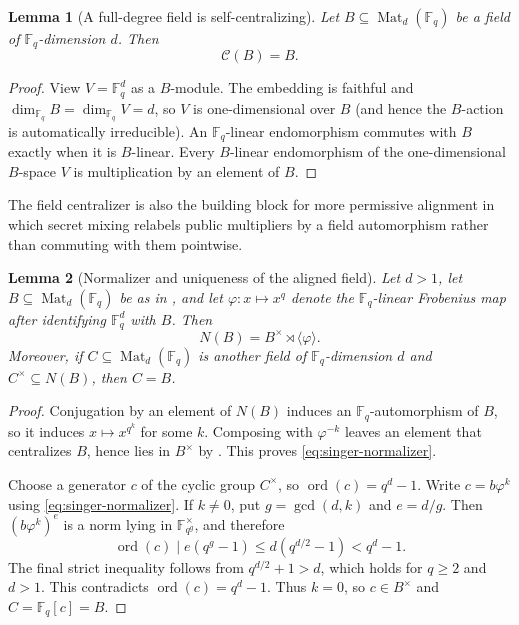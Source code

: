 \documentclass[11pt]{article}
\newtheorem{lemma}[lemma]{Lemma}
\newcommand{\F}{\mathbb F}
\newcommand{\Mat}{\operatorname{Mat}}
\begin{document}
\begin{lemma}[A full-degree field is self-centralizing]
\label{lem:field-centralizer}
Let $B\subseteq\Mat_d(\F_q)$ be a field of $\F_q$-dimension $d$.  Then
\[
  \mathcal C(B)=B.
\]
\end{lemma}

\begin{proof}
View $V=\F_q^d$ as a $B$-module.  The embedding is faithful and
$\dim_{\F_q}B=\dim_{\F_q}V=d$, so $V$ is one-dimensional over $B$
(and hence the $B$-action is automatically irreducible).  An
$\F_q$-linear endomorphism commutes with $B$ exactly when it is
$B$-linear.  Every $B$-linear endomorphism of the
one-dimensional $B$-space $V$ is multiplication by an element of $B$.
\end{proof}

The field centralizer is also the building block for more permissive
alignment in which secret mixing relabels public multipliers by a field
automorphism rather than commuting with them pointwise.

\begin{lemma}[Normalizer and uniqueness of the aligned field]
\label{lem:field-normalizer}
Let $d>1$, let $B\subseteq\Mat_d(\F_q)$ be as in
, and let $\varphi:x\mapsto x^q$ denote the
$\F_q$-linear Frobenius map after identifying $\F_q^d$ with $B$.  Then
\begin{equation}
 N(B)=B^\times\rtimes\langle\varphi\rangle.          \label{eq:singer-normalizer}
\end{equation}
Moreover, if $C\subseteq\Mat_d(\F_q)$ is another field of
$\F_q$-dimension $d$ and $C^\times\subseteq N(B)$, then $C=B$.
\end{lemma}

\begin{proof}
Conjugation by an element of $N(B)$ induces an $\F_q$-automorphism of $B$,
so it induces $x\mapsto x^{q^k}$ for some $k$.  Composing with
$\varphi^{-k}$ leaves an element that centralizes $B$, hence lies in
$B^\times$ by .  This proves
\eqref{eq:singer-normalizer}.

Choose a generator $c$ of the cyclic group $C^\times$, so
$\operatorname{ord}(c)=q^d-1$.  Write $c=b\varphi^k$ using
\eqref{eq:singer-normalizer}.  If $k\ne0$, put
$g=\gcd(d,k)$ and $e=d/g$.  Then $(b\varphi^k)^e$ is a norm lying in
$\F_{q^g}^\times$, and therefore
\[
 \operatorname{ord}(c)\mid e(q^g-1)
 \le d(q^{d/2}-1)<q^d-1.
\]
The final strict inequality follows from $q^{d/2}+1>d$, which holds for
$q\ge2$ and $d>1$.
This contradicts $\operatorname{ord}(c)=q^d-1$.  Thus $k=0$, so
$c\in B^\times$ and $C=\F_q[c]=B$.
\end{proof}
\end{document}
